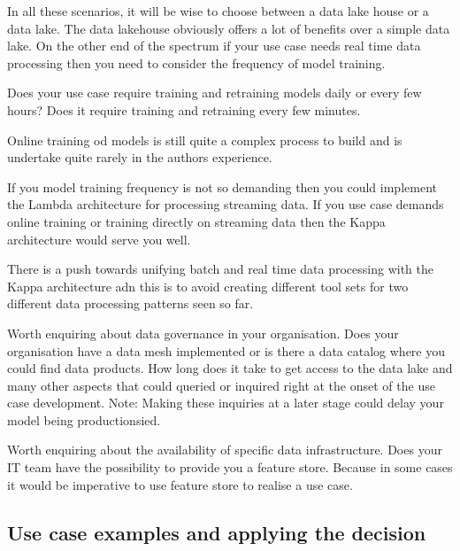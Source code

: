\documentclass[a4paper, 11pt]{article}
\begin{document}
    In all these scenarios, it will be wise to choose between a data lake house or a data lake.
    The data lakehouse obviously offers a lot of benefits over a simple data lake.
    On the other end of the spectrum if your use case needs real time data processing then you need to consider the frequency of model training.

    Does your use case require training and retraining models daily or every few hours?
    Does it require training and retraining every few minutes.

    Online training od models is still quite a complex process to build and is undertake quite rarely in the authors experience.

    If you model training frequency is not so demanding then you could implement the Lambda architecture for processing streaming data.
    If you use case demands online training or training directly on streaming data then the Kappa architecture would serve you well.

    There is a push towards unifying batch and real time data processing with the Kappa architecture adn this is to avoid creating different tool sets for two different data processing patterns seen so far.

    Worth enquiring about data governance in your organisation.
    Does your organisation have a data mesh implemented or is there a data catalog where you could find data products.
    How long does it take to get access to the data lake and many other aspects that could queried or inquired right at the onset of the use case development.
    Note: Making these inquiries at a later stage could delay your model being productionsied.

    Worth enquiring about the availability of specific data infrastructure.
    Does your IT team have the possibility to provide you a feature store.
    Because in some cases it would be imperative to use feature store to realise a use case.

    \subsection{Use case examples and applying the decision}
\end{document}
